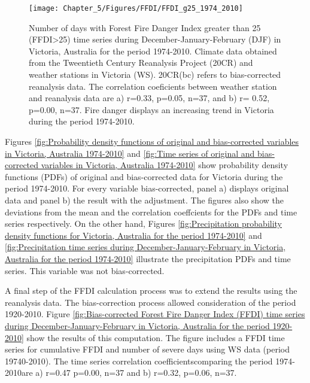 \begin{figure}[H]
\noindent \begin{centering}
\texttt{[image: Chapter\_5/Figures/FFDI/FFDI\_g25\_1974\_2010]}
\par\end{centering}

\noindent \centering{}\caption{Number of days with Forest Fire Danger Index greater than 25 (FFDI>25)
time series during December-January-February (DJF) in Victoria, Australia
for the period 1974-2010. Climate data obtained from the Tweentieth
Century Reanalysis Project (20CR) and weather stations in Victoria
(WS). 20CR(bc) refers to bias-corrected reanalysis data. The correlation
coeficients between weather station and reanalysis data are a) r=0.33,
p=0.05, n=37, and b) r= 0.52, p=0.00, n=37. Fire danger displays an
increasing trend in Victoria during the period 1974-2010. \label{fig: Number of days with Forest Fire Danger Index greater than 25 time series during December-January-February in Victoria, Australia for the period 1974-2010}}
\end{figure}


Figures \ref{fig:Probability density functions of original and bias-corrected variables in Victoria, Australia 1974-2010}
and \ref{fig:Time series of original and bias-corrected variables in Victoria, Australia 1974-2010}
show probability density functions (PDFs) of original and bias-corrected
data for Victoria during the period 1974-2010. For every variable
bias-corrected, panel a) displays original data and panel b) the result
with the adjustment. The figures also show the deviations from the
mean and the correlation coeffcients for the PDFs and time series
respectively. On the other hand, Figures \ref{fig:Precipitation probability density functions for Victoria, Australia for the period 1974-2010}
and \ref{fig:Precipitation time series during December-January-February in Victoria, Australia for the period 1974-2010}
illustrate the precipitation PDFs and time series. This variable was
not bias-corrected.

A final step of the FFDI calculation process was to extend the results
using the reanalysis data. The bias-correction process allowed consideration of the period 1920-2010. Figure \ref{fig:Bias-corrected Forest Fire Danger Index (FFDI) time series during December-January-February in Victoria, Australia for the period 1920-2010}
show the results of this computation. The figure includes a FFDI time
series for cumulative FFDI and number of severe days using WS data (period 19740-2010). The time series correlation
coefficients\textemdash comparing the period 1974-2010\textemdash are
a) r=0.47 p=0.00, n=37 and b) r=0.32, p=0.06, n=37.

